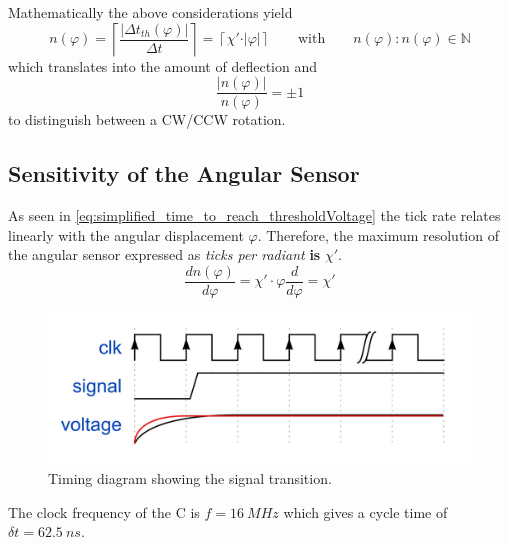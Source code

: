         Mathematically the above considerations yield
        \begin{equation}
            n(\varphi) = \left\lceil \frac{\left\vert \Delta t_{th}(\varphi) \right\vert }{\Delta t} \right\rceil = \left\lceil \chi' \cdot \vert\varphi\vert \right\rceil \qquad \text{with} \qquad n(\varphi): n(\varphi) \in \mathbb{N}
            \label{eq:value_of_cycle_Count}
        \end{equation}
        which translates into the amount of deflection and
        \begin{equation}
            \frac{\vert n(\varphi)\vert}{n(\varphi)} = \pm 1
            \label{eq:sign_of_cycle_count}
        \end{equation}
        to distinguish between a CW/CCW rotation.
    \subsection{Sensitivity of the Angular Sensor}\label{sec:preparation_task_8}
        As seen in \cref{eq:simplified_time_to_reach_thresholdVoltage} the tick rate relates linearly with the angular displacement \( \varphi \).
        Therefore, the maximum resolution of the angular sensor expressed as \textit{ticks per radiant} \textbf{is} \( \chi' \).
        \begin{equation}
            \frac{dn(\varphi)}{d\varphi} = \chi' \cdot \varphi \frac{d}{d\varphi} = \chi'
        \end{equation}
        \begin{figure}[H]
            \centering
            \includegraphics[width=.7\textwidth]{aufbau/clk_signal_timing_diagram.jpg}
            \caption[Timing diagram showing the signal transition]{Timing diagram showing the signal transition.}
            \label{fig:timing_diagram}
        \end{figure}
        The clock frequency of the \micro C is \( f = \SI[]{16}[]{MHz} \) which gives a cycle time of \( \delta t = \SI[]{62.5}[]{ns} \).
        
